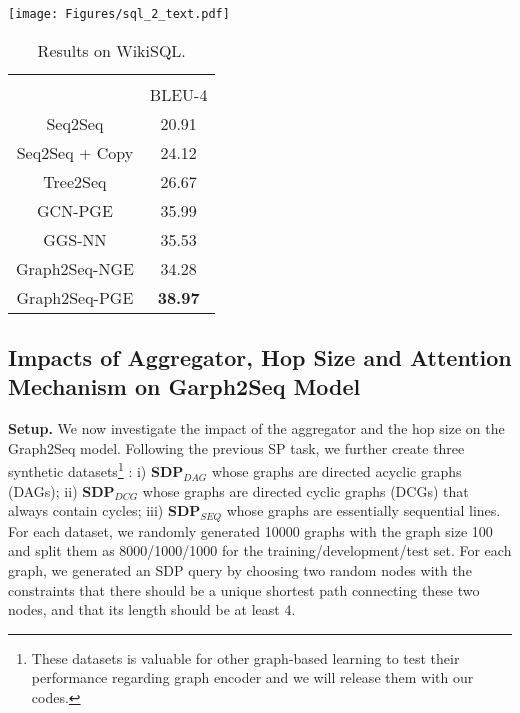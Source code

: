 \documentclass{article} \usepackage{iclr2019_conference,times}
\begin{document}
\begin{table}[t!]
\begin{minipage}[t]{0.53\linewidth}
    \vspace{0pt}
    \centering\texttt{[image: Figures/sql\_2\_text.pdf]}
    \label{fig:nlg_example}
  \end{minipage}
    \begin{minipage}[t]{0.4\linewidth}
     \vspace{0pt}
    \centering
    \small
    \begin{tabular}{cc}
    \\\\
     & BLEU-4  \\
\hline
    Seq2Seq & 20.91 \\
    Seq2Seq + Copy & 24.12 \\
    Tree2Seq & 26.67 \\
    \hline
    GCN-PGE & 35.99 \\
    GGS-NN & 35.53 \\
    Graph2Seq-NGE & 34.28 \\
    Graph2Seq-PGE & \textbf{38.97} \\
\hline
    \end{tabular}
    \caption{Results on WikiSQL.}
    \label{tab:nlg_results}
  \end{minipage}\vspace{-0.7cm}
\end{table}









\subsection{Impacts of Aggregator, Hop Size and Attention Mechanism on Garph2Seq Model}
\label{sec:impacts of aggregator and neighbor-node selection}

\textbf{Setup.} We now investigate the impact of the aggregator and the hop size on the Graph2Seq model. Following the previous SP task, we further create three synthetic datasets\footnote{These datasets is valuable for other graph-based learning to test their performance regarding graph encoder and we will release them with our codes.}
: i) \textbf{SDP$_{DAG}$} whose graphs are directed acyclic graphs (DAGs); ii) \textbf{SDP$_{DCG}$} whose graphs are directed cyclic graphs (DCGs) that always contain cycles; iii) \textbf{SDP$_{SEQ}$} whose graphs are essentially sequential lines. For each dataset, we randomly generated 10000 graphs with the graph size 100 and split them as 8000/1000/1000 for the training/development/test set.
For each graph, we generated an SDP query by choosing two random nodes with the constraints that there should be a unique shortest path connecting these two nodes, and that its length should be at least 4. 
\end{document}
